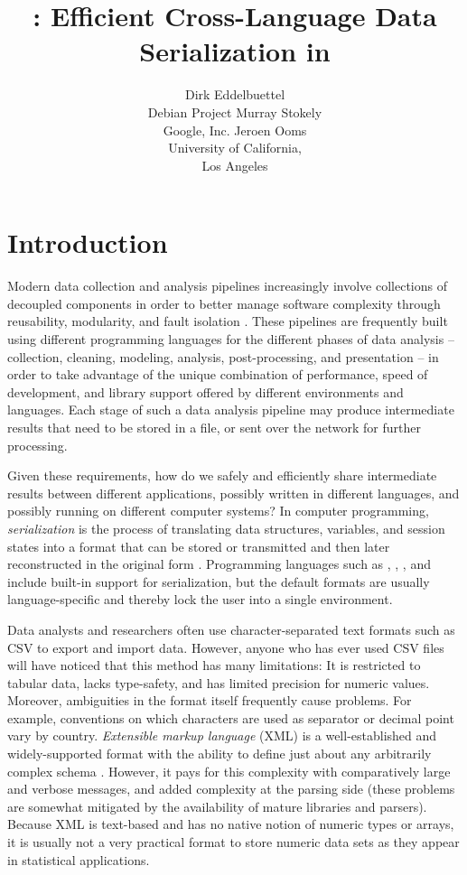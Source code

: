 \documentclass[article]{jss}
\author{Dirk Eddelbuettel\\Debian Project \And 
        Murray Stokely\\Google, Inc. \And
        Jeroen Ooms\\University of California,\\Los Angeles}
\title{\pkg{RProtoBuf}: Efficient Cross-Language Data Serialization in \proglang{R}}
\begin{document}
\vspace*{-0.3cm}

\section{Introduction} 

Modern data collection and analysis pipelines increasingly involve collections
of decoupled components in order to better manage software complexity 
through reusability, modularity, and fault isolation \citep{Wegiel:2010:CTT:1932682.1869479}.
These pipelines are frequently built using different programming 
languages for the different phases of data analysis -- collection,
cleaning, modeling, analysis, post-processing, and
presentation -- in order to take advantage of the unique combination of
performance, speed of development, and library support offered by
different environments and languages.  Each stage of such a data
analysis pipeline may produce intermediate results that need to be
stored in a file, or sent over the network for further processing. 

Given these requirements, how do we safely and efficiently share
intermediate results between different applications, possibly written
in different languages, and possibly running on different computer
systems?  In computer programming, \emph{serialization} is the process
of translating data structures, variables, and session states into a
format that can be stored or transmitted and then later reconstructed
in the original form \citep{clinec++}.  Programming languages such as
 \citep{r},  \citep{julia},
, and  \citep{python} include built-in
support for serialization, but the default formats are usually
language-specific and thereby lock the user into a single environment.

Data analysts and researchers often use character-separated text
formats such as CSV \citep{shafranovich2005common} to export
and import data. However, anyone who has ever used CSV files
will have noticed that this method has many limitations: It is
restricted to tabular data, lacks type-safety, and has limited
precision for numeric values.  Moreover, ambiguities in the format
itself frequently cause problems.  For example, conventions on which
characters are used as separator or decimal point vary by country.
\emph{Extensible markup language} (XML) is a well-established
and widely-supported format with the ability to define just about any
arbitrarily complex schema \citep{nolan2013xml}. However, it pays for
this complexity with comparatively large and verbose messages, and
added complexity at the parsing side (these problems are somewhat
mitigated by the availability of mature libraries and
parsers). Because XML is text-based and has no native notion of
numeric types or arrays, it is usually not a very practical format to
store numeric data sets as they appear in statistical applications.
\end{document}
